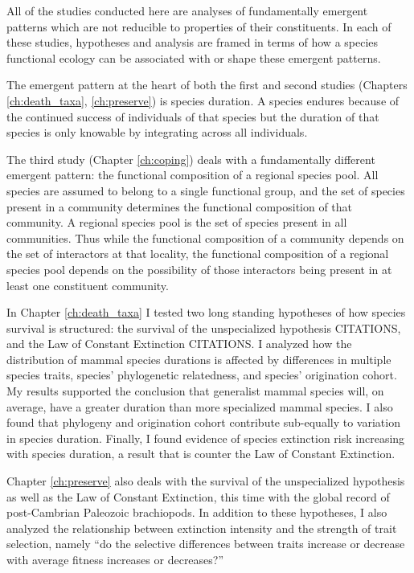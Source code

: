 All of the studies conducted here are analyses of fundamentally emergent patterns which are not reducible to properties of their constituents. In each of these studies, hypotheses and analysis are framed in terms of how a species functional ecology can be associated with or shape these emergent patterns. 

The emergent pattern at the heart of both the first and second studies (Chapters \ref{ch:death_taxa}, \ref{ch:preserve}) is species duration. A species endures because of the continued success of individuals of that species but the duration of that species is only knowable by integrating across all individuals.

The third study (Chapter \ref{ch:coping}) deals with a fundamentally different emergent pattern: the functional composition of a regional species pool. All species are assumed to belong to a single functional group, and the set of species present in a community determines the functional composition of that community. A regional species pool is the set of species present in all communities. Thus while the functional composition of a community depends on the set of interactors at that locality, the functional composition of a regional species pool depends on the possibility of those interactors being present in at least one constituent community.

In Chapter \ref{ch:death_taxa} I tested two long standing hypotheses of how species survival is structured: the survival of the unspecialized hypothesis CITATIONS, and the Law of Constant Extinction CITATIONS. I analyzed how the distribution of mammal species durations is affected by differences in multiple species traits, species' phylogenetic relatedness, and species' origination cohort. My results supported the conclusion that generalist mammal species will, on average, have a greater duration than more specialized mammal species. I also found that phylogeny and origination cohort contribute sub-equally to variation in species duration. Finally, I found evidence of species extinction risk increasing with species duration, a result that is counter the Law of Constant Extinction.

Chapter \ref{ch:preserve} also deals with the survival of the unspecialized hypothesis as well as the Law of Constant Extinction, this time with the global record of post-Cambrian Paleozoic brachiopods. In addition to these hypotheses, I also analyzed the relationship between extinction intensity and the strength of trait selection, namely ``do the selective differences between traits increase or decrease with average fitness increases or decreases?''


